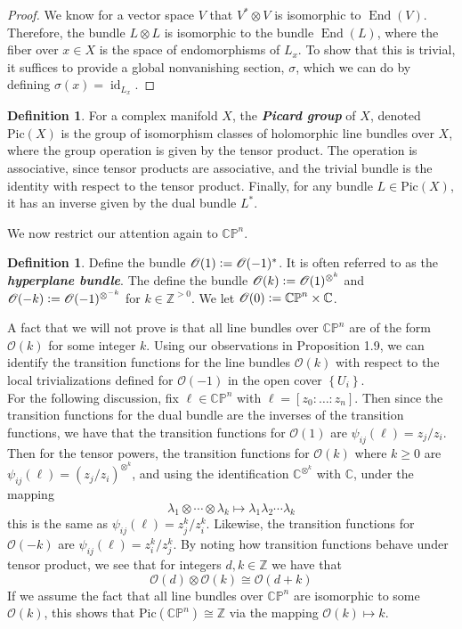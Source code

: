 \documentclass[psamsfonts, 12pt]{amsart}
\theoremstyle{definition}
\newtheorem{defn}[thm]{Definition}
\theoremstyle{remark}
\renewcommand{\O}{\mathscr{O}}
\newcommand{\ib}[1]{\textbf{\textit{#1}}}
\newcommand{\Z}{\mathbb{Z}}
\newcommand{\C}{\mathbb{C}}
\newcommand{\CP}{\mathbb{CP}}
\newcommand{\set}[1]{\left\lbrace #1 \right\rbrace}
\newcommand{\defeq}{\vcentcolon=}
\DeclareMathOperator{\id}{id}
\DeclareMathOperator{\End}{End}
\begin{document}
%
\begin{proof}
We know for a vector space $V$ that $V^*\otimes V$ is isomorphic to $\End(V)$.
Therefore, the bundle $L \otimes L$ is isomorphic to the bundle
$\End(L)$, where the fiber over $x \in X$ is the space of endomorphisms of $L_x$.
To show that this is trivial, it suffices to provide a global nonvanishing section,
$\sigma$, which we can do by defining $\sigma(x) = \id_{L_x}$.
\end{proof}
%
\begin{defn}
For a complex manifold $X$, the \ib{Picard group} of $X$, denoted
$\mathrm{Pic}(X)$ is the group of isomorphism classes of holomorphic line bundles over
$X$, where the group operation is given by the tensor product. The operation is
associative, since tensor products are associative, and the trivial bundle is the
identity with respect to the tensor product. Finally, for any bundle
$L \in \mathrm{Pic}(X)$, it has an inverse given by the dual bundle $L^*$.
\end{defn}
%
We now restrict our attention again to $\CP^n$.
%
\begin{defn}
Define the bundle $\O(1) \defeq \O(-1)^*$. It is often referred to as the
\ib{hyperplane bundle}. The define the bundle $\O(k) \defeq \O(1)^{\otimes^k}$
and $\O(-k) \defeq \O(-1)^{\otimes^{-k}}$ for $k \in \Z^{>0}$. We let
$\O(0)\defeq \CP^n \times \C$.
\end{defn}
%
A fact that we will not prove is that all line bundles over $\CP^n$ are of
the form $\O(k)$ for some integer $k$. Using our observations in Proposition 1.9,
we can identify the transition functions for the line bundles $\O(k)$ with
respect to the local trivializations defined for $\O(-1)$ in the open cover
$\set{U_i}$. \\

For the following discussion, fix $\ell \in \CP^n$ with $\ell = [z_0: \ldots : z_n]$.
Then since the transition functions for the dual bundle are the inverses of the
transition functions, we have that the transition functions for $\O(1)$ are
$\psi_{ij}(\ell) = z_j/z_i$. Then for the tensor powers, the transition functions
for $\O(k)$ where $k \geq 0$ are $\psi_{ij}(\ell) = (z_j/z_i)^{\otimes^k}$, and
using the identification $\C^{\otimes^k}$ with $\C$, under the mapping
\[
\lambda_1 \otimes \cdots \otimes \lambda_k \mapsto \lambda_1\lambda_2\cdots\lambda_k
\]
this is the same as
$\psi_{ij}(\ell) = z_j^k/z_i^k$. Likewise, the transition functions for $\O(-k)$
are $\psi_{ij}(\ell) = z_i^k/z_j^k$. By noting how transition functions behave
under tensor product, we see that for integers $d,k \in \Z$ we have that
\[
\O(d) \otimes \O(k) \cong \O(d+k)
\]
If we assume the fact that all line bundles over $\CP^n$ are isomorphic to some
$\O(k)$, this shows that $\mathrm{Pic}(\CP^n) \cong \Z$ via the mapping
$\O(k)\mapsto k$. \\
\end{document}
